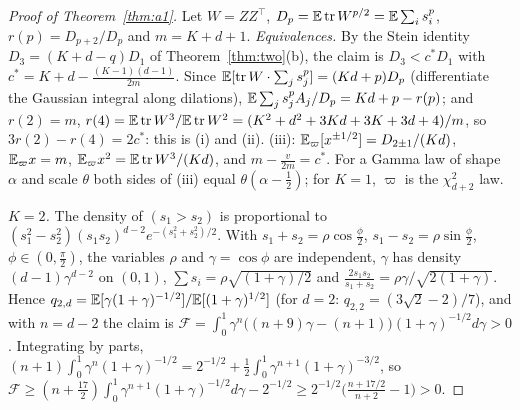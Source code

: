 \begin{proof}[Proof of Theorem~\ref{thm:a1}]
Let $W=ZZ^\top$, $D_p=\mathbb{E}\operatorname{tr} W^{p/2}=\mathbb{E}\sum_is_i^p$, $r(p)=D_{p+2}/D_p$ and $m=K+d+1$.
\emph{Equivalences.} By the Stein identity $D_3=(K+d-q)D_1$ of Theorem~\ref{thm:two}(b), the claim is
$D_3<c^\ast D_1$ with $c^\ast=K+d-\frac{(K-1)(d-1)}{2m}$. Since $\mathbb{E}[\operatorname{tr} W\cdot\sum_js_j^p]=(Kd+p)D_p$ (differentiate the
Gaussian integral along dilations), $\mathbb{E}\sum_js_j^pA_j/D_p=Kd+p-r(p)$; and $r(2)=m$,
$r(4)=\mathbb{E}\operatorname{tr} W^3/\mathbb{E}\operatorname{tr} W^2=(K^2+d^2+3Kd+3K+3d+4)/m$, so $3r(2)-r(4)=2c^\ast$: this is (i) and (ii). (iii):
$\mathbb{E}_\varpi[x^{\pm1/2}]=D_{2\pm1}/(Kd)$, $\mathbb{E}_\varpi x=m$, $\mathbb{E}_\varpi x^2=\mathbb{E}\operatorname{tr} W^3/(Kd)$, and $m-\frac v{2m}=c^\ast$. For a Gamma law
of shape $\alpha$ and scale $\theta$ both sides of (iii) equal $\theta(\alpha-\frac12)$; for $K=1$, $\varpi$ is the $\chi^2_{d+2}$ law.

\emph{$K=2$.} The density of $(s_1>s_2)$ is proportional to $(s_1^2-s_2^2)(s_1s_2)^{d-2}e^{-(s_1^2+s_2^2)/2}$. With
$s_1+s_2=\rho\cos\frac\phi2$, $s_1-s_2=\rho\sin\frac\phi2$, $\phi\in(0,\frac\pi2)$, the variables $\rho$ and
$\gamma=\cos\phi$ are independent, $\gamma$ has density $(d-1)\gamma^{d-2}$ on $(0,1)$,
$\sum s_i=\rho\sqrt{(1+\gamma)/2}$ and $\frac{2s_1s_2}{s_1+s_2}=\rho\gamma/\sqrt{2(1+\gamma)}$. Hence
$q_{2,d}=\mathbb{E}[\gamma(1+\gamma)^{-1/2}]/\mathbb{E}[(1+\gamma)^{1/2}]$ (for $d=2$: $q_{2,2}=(3\sqrt2-2)/7$), and with $n=d-2$ the claim
is $\mathcal F=\int_0^1\gamma^n\big((n+9)\gamma-(n+1)\big)(1+\gamma)^{-1/2}d\gamma>0$. Integrating by parts,
$(n+1)\int_0^1\gamma^n(1+\gamma)^{-1/2}=2^{-1/2}+\frac12\int_0^1\gamma^{n+1}(1+\gamma)^{-3/2}$, so
$\mathcal F\ge(n+\frac{17}2)\int_0^1\gamma^{n+1}(1+\gamma)^{-1/2}d\gamma-2^{-1/2}\ge2^{-1/2}\big(\frac{n+17/2}{n+2}-1\big)>0$.


\end{proof}
